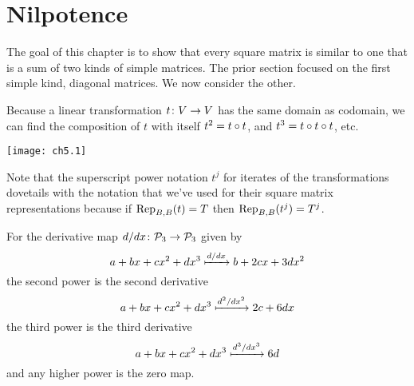 \section{Nilpotence}
The goal of this chapter is to show that every square matrix is similar to one
that is a sum of two kinds of simple matrices.
The prior section
focused on the first simple kind, diagonal matrices.
We now consider the other.










Because a linear transformation $\map{t}{V}{V}$ has the same domain as
codomain, we can
find the composition of $t$ with itself 
\( t^2=\composed{t}{t} \), 
and \( t^3=\composed{t}{\composed{t}{t}} \), etc. %
\begin{center}
  \texttt{[image: ch5.1]}
\end{center}
Note that the superscript
power notation $t^j$ for iterates of the transformations 
dovetails with 
the notation that we've used for their square matrix representations
because if $\rep{t}{B,B}=T$ then \( \rep{t^j}{B,B}=T^j \).


\begin{example} \label{ex:DerivIter}
For the derivative map \( \map{d/dx}{\polyspace_3}{\polyspace_3} \)
given by 
\begin{equation*}
  a+bx+cx^2+dx^3\xmapsunder{d/dx} b+2cx+3dx^2
\end{equation*}
the second power is the second derivative
\begin{equation*}
  a+bx+cx^2+dx^3\xmapsunder{d^2/dx^2} 2c+6dx 
\end{equation*}
the third power is the third derivative
\begin{equation*}
  a+bx+cx^2+dx^3\xmapsunder{d^3/dx^3} 6d 
\end{equation*}
and any higher power is the zero map.
\end{example}

